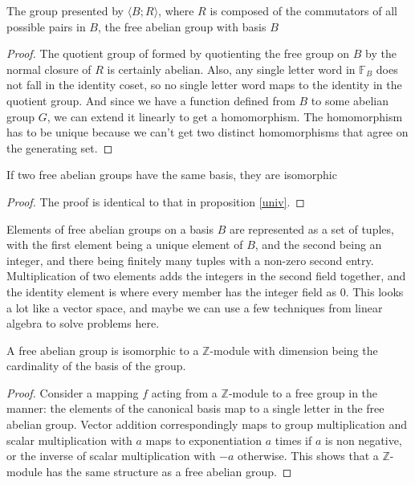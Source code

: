 \begin{lem}
The group presented by $\langle B ; R \rangle$, where $R$ is composed of the commutators of all possible pairs in $B$, the free abelian group with basis $B$
\end{lem}

\begin{proof}
The quotient group of formed by quotienting the free group on $B$ by the normal closure of $R$ is certainly abelian. Also, any single letter word in $\mathbb{F}_B$ does not fall in the identity coset, so no single letter word maps to the identity in the quotient group. And since we have a function defined from $B$ to some abelian group $G$, we can extend it linearly to get a homomorphism. The homomorphism has to be unique because we can't get two distinct homomorphisms that agree on the generating set.
\end{proof}

\begin{lem}
If two free abelian groups have the same basis, they are isomorphic
\end{lem}

\begin{proof}
The proof is identical to that in proposition \autoref{univ}.
\end{proof}

Elements of free abelian groups on a basis $B$ are represented as a set of tuples, with the first element being a unique element of $B$, and the second being an integer, and there being finitely many tuples with a non-zero second entry. Multiplication of two elements adds the integers in the second field together, and the identity element is where every member has the integer field as $0$. This looks a lot like a vector space, and maybe we can use a few techniques from linear algebra to solve problems here.

\begin{lem}
A free abelian group is isomorphic to a $\mathbb{Z}$-module with dimension being the cardinality of the basis of the group.
\end{lem}

\begin{proof}
Consider a mapping $f$ acting from a $\mathbb{Z}$-module to a free group in the manner: the elements of the canonical basis map to a single letter in the free abelian group. Vector addition correspondingly maps to group multiplication and scalar multiplication with $a$ maps to exponentiation $a$ times if $a$ is non negative, or the inverse of scalar multiplication with $-a$ otherwise. This shows that a $\mathbb{Z}$-module has the same structure as a free abelian group.
\end{proof}

